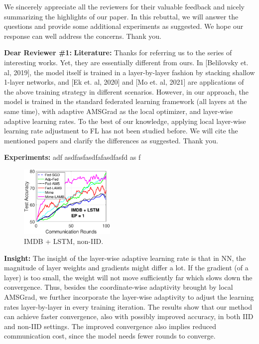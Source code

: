 \documentclass{article}
\begin{document}
\onecolumn

We sincerely appreciate all the reviewers for their valuable feedback  and nicely summarizing the highlights of our paper. In this rebuttal, we will answer the questions and provide some additional experiments as suggested. We hope our response can well address the concerns. Thank you.

{\color{blue} \textbf{Dear Reviewer \#1:}} \textbf{Literature:} Thanks for referring us to the series of interesting works. Yet, they are essentially different from ours. In [Belilovsky et. al, 2019], the model itself is trained in a layer-by-layer fashion by stacking shallow 1-layer networks, and [Ek et. al, 2020] and [Mo et. al, 2021] are applications of the above training strategy in different scenarios. However, in our approach, the model is trained in the standard federated learning framework (all layers at the same time), with adaptive AMSGrad as the local optimizer, and layer-wise adaptive learning rates. To the best of our knowledge, applying local layer-wise learning rate adjustment to FL has not been studied before. We will cite the mentioned papers and clarify the differences as suggested. Thank you.


\textbf{Experiments:} adf asdfasfasdfafasdfasfd as f

\begin{figure}
  \begin{center}
  \vspace{-0.25in}
    \includegraphics[width=1.8in]{icml_rebuttal_fig/imdb_testerror_lstm_ep1_client50_iid0.eps}
  \end{center}
  \vspace{-0.15in}
  \caption{IMDB + LSTM, non-IID.}
  \label{emp-var}\vspace{-0.1in}
\end{figure}


\textbf{Insight:} The insight of the layer-wise adaptive learning rate is that in NN, the magnitude of layer weights and gradients might differ a lot. If the gradient (of a layer) is too small, the weight will not move sufficiently far which slows down the convergence. Thus, besides the coordinate-wise adaptivity brought by local AMSGrad, we further incorporate the layer-wise adaptivity to adjust the learning rates layer-by-layer in every training iteration. The results show that our method can achieve faster convergence, also with possibly improved accuracy, in both IID and non-IID settings. The improved convergence also implies reduced communication cost, since the model needs fewer rounds to converge.
\end{document}
